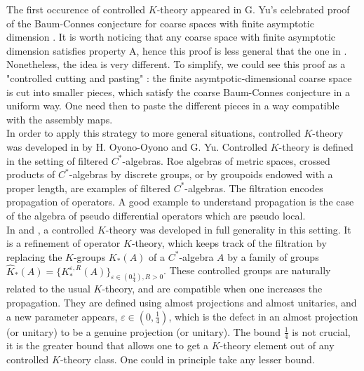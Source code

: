 The first occurence of controlled $K$-theory appeared in G. Yu's celebrated proof of the Baum-Connes conjecture for coarse spaces with finite asymptotic dimension \cite{Yu1}. It is worth noticing that any coarse space with finite asymptotic dimension satisfies property A, hence this proof is less general that the one in \cite{Yu2}. Nonetheless, the idea is very different. To simplify, we could see this proof as a "controlled cutting and pasting" : the finite asymtpotic-dimensional coarse space is cut into smaller pieces, which satisfy the coarse Baum-Connes conjecture in a uniform way. One need then to paste the different pieces in a way compatible with the assembly maps.\\ %

In order to apply this strategy to more general situations, controlled $K$-theory was developed in \cite{OY2} by H. Oyono-Oyono and G. Yu. Controlled $K$-theory is defined in the setting of filtered $C^*$-algebras. Roe algebras of metric spaces, crossed products of $C^*$-algebras by discrete groups, or by groupoids endowed with a proper length, are examples of filtered $C^*$-algebras. The filtration encodes propagation of operators. A good example to understand propagation is the case of the algebra of pseudo differential operators which are pseudo local.\\ %

In \cite{OY2} and \cite{OY3}, a controlled $K$-theory was developed in full generality in this setting. It is a refinement of operator $K$-theory, which keeps track of the filtration by replacing the $K$-groups $K_*(A)$ of a $C^*$-algebra $A$ by a family of groups $\hat K_*(A)= \{K_*^{\varepsilon,R}(A)\}_{\varepsilon\in (0\frac{1}{4}),R>0}$. These controlled groups are naturally related to the usual $K$-theory, and are compatible when one increases the propagation. They are defined using almost projections and almost unitaries, and a new parameter appears, $\varepsilon\in (0 , \frac{1}{4})$, which is the defect in an almost projection (or unitary) to be a genuine projection (or unitary). %
The bound $\frac{1}{4}$ is not crucial, it is the greater bound that allows one to get a $K$-theory element out of any controlled $K$-theory class. One could in principle take any lesser bound.\\ 

